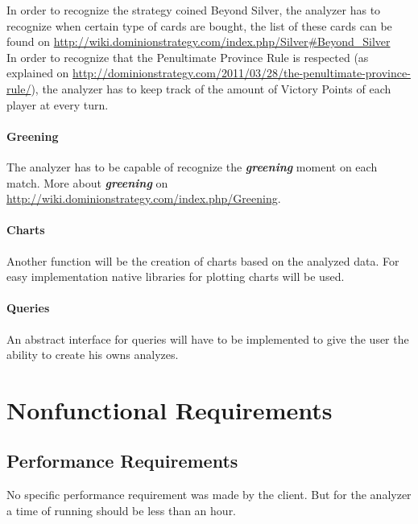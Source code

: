 \documentclass{scrreprt}
\begin{document}
In order to recognize the strategy coined Beyond Silver, the analyzer has to recognize when certain type of cards are bought, the list of these cards can be found on \url{http://wiki.dominionstrategy.com/index.php/Silver#Beyond_Silver}\\

In order to recognize that the Penultimate Province Rule is respected (as explained on \url{http://dominionstrategy.com/2011/03/28/the-penultimate-province-rule/}), the analyzer has to keep track of the amount of Victory Points of each player at every turn.


\subsubsection{Greening}
The analyzer has to be capable of recognize the \textit{\textbf{greening}} moment on each match.
More about \textit{\textbf{greening}} on \url{http://wiki.dominionstrategy.com/index.php/Greening}.

\subsubsection{Charts}
Another function will be the creation of charts based on the analyzed data.
For easy implementation native libraries for plotting charts will be used.

\subsubsection{Queries}
An abstract interface for queries will have to be implemented to give the user
the ability to create his owns analyzes.





\chapter{Nonfunctional Requirements}

\section{Performance Requirements}
No specific performance requirement was made by the client. But for the analyzer
a time of running should be less than an hour.
\end{document}
